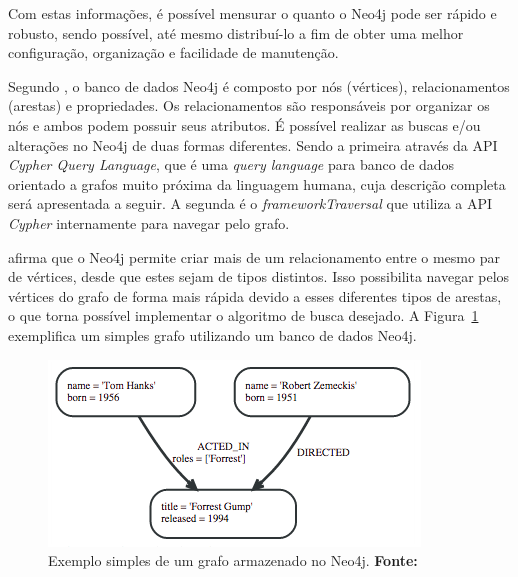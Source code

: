 
\par Com estas informações, é possível mensurar o quanto o Neo4j pode ser rápido e robusto, sendo possível, até mesmo distribuí-lo a fim de obter uma melhor configuração, organização e facilidade de manutenção.

\par Segundo , o banco de dados Neo4j é composto por nós (vértices), relacionamentos (arestas) e propriedades. Os relacionamentos são responsáveis por organizar os nós e ambos podem possuir seus atributos. É possível realizar as buscas e/ou alterações no Neo4j de duas formas diferentes. Sendo a primeira através da API \textit{Cypher Query Language}, que é uma \textit{query language} para banco de dados orientado a grafos muito próxima da linguagem humana, cuja descrição completa será apresentada a seguir. A segunda é o \textit{framework\footnotemark[12] Traversal} que utiliza a API \textit{Cypher} internamente para navegar pelo grafo.



 afirma que o Neo4j permite criar mais de um relacionamento entre o mesmo par de vértices, desde que estes sejam de tipos distintos. Isso possibilita navegar pelos vértices do grafo de forma mais rápida devido a esses diferentes tipos de arestas, o que torna possível implementar o algoritmo de busca desejado. A Figura~\ref{fig:grafo_simples_neo4j} exemplifica um simples grafo utilizando um banco de dados Neo4j.


\begin{figure}[h!]
	\centerline{\includegraphics[scale=0.8]{./imagens/simple_graph_neo4j.png}}
	\caption[Exemplo simples de um grafo armazenado no Neo4j]
	{Exemplo simples de um grafo armazenado no Neo4j. \textbf{Fonte:} }
	\label{fig:grafo_simples_neo4j}
\end{figure}

